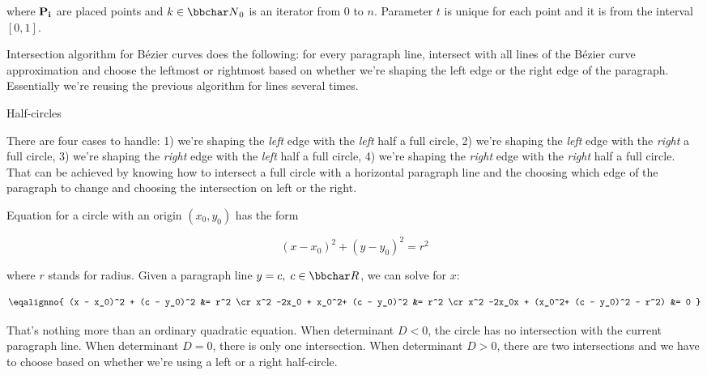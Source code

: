 where $\bf P_i$ are placed points and $k \in {\bbchar N}_0$ is an iterator from $0$ to $n$.
Parameter $t$ is unique for each point and it is from the interval $[0,1]$.

Intersection algorithm for Bézier curves does the following: for every paragraph
line, intersect with all lines of the Bézier curve approximation and choose the
leftmost or rightmost based on whether we're shaping the left edge or the right edge
of the paragraph. Essentially we're reusing the previous algorithm for lines several
times.

\curvetitle Half-circles

There are four cases to handle:
1) we're shaping the {\it left} edge with the {\it left} half a full circle,
2) we're shaping the {\it left} edge with the {\it right} a full circle,
3) we're shaping the {\it right} edge with the {\it left} half a full circle,
4) we're shaping the {\it right} edge with the {\it right} half a full circle.
That can be achieved by knowing how to intersect a full circle with a horizontal
paragraph line and the choosing which edge of the paragraph to change and choosing
the intersection on left or the right.

Equation for a circle with an origin $(x_0, y_0)$ has the form

$$
(x - x_0)^2 + (y - y_0)^2 = r^2
$$

where $r$ stands for radius. Given a paragraph line $y = c,\;c\in{\bbchar R}$, we can solve
for $x$:

$$
\eqalignno{
(x - x_0)^2 + (c - y_0)^2 &= r^2 \cr
x^2 -2x_0 + x_0^2+ (c - y_0)^2 &= r^2 \cr
x^2 -2x_0x + (x_0^2+ (c - y_0)^2 - r^2) &= 0
}
$$

That's nothing more than an ordinary quadratic equation. When determinant $D < 0$,
the circle has no intersection with the current paragraph line. When determinant $D = 0$,
there is only one intersection. When determinant $D > 0$, there are two intersections
and we have to choose based on whether we're using a left or a right half-circle.

\bye
